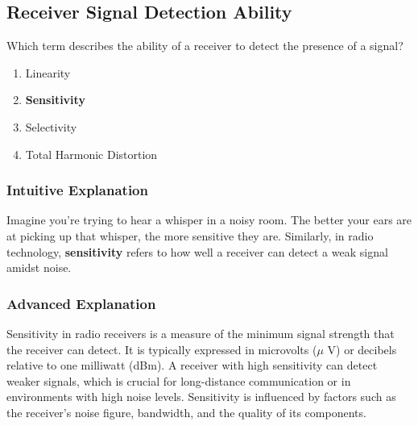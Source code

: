 \subsection{Receiver Signal Detection Ability}
\label{T7A01}

\begin{tcolorbox}[colback=gray!10!white,colframe=black!75!black,title=T7A01]
Which term describes the ability of a receiver to detect the presence of a signal?
\begin{enumerate}[noitemsep]
    \item Linearity
    \item \textbf{Sensitivity}
    \item Selectivity
    \item Total Harmonic Distortion
\end{enumerate}
\end{tcolorbox}

\subsubsection*{Intuitive Explanation}
Imagine you're trying to hear a whisper in a noisy room. The better your ears are at picking up that whisper, the more sensitive they are. Similarly, in radio technology, \textbf{sensitivity} refers to how well a receiver can detect a weak signal amidst noise.

\subsubsection*{Advanced Explanation}
Sensitivity in radio receivers is a measure of the minimum signal strength that the receiver can detect. It is typically expressed in microvolts ($\mu$ V) or decibels relative to one milliwatt (dBm). A receiver with high sensitivity can detect weaker signals, which is crucial for long-distance communication or in environments with high noise levels. Sensitivity is influenced by factors such as the receiver's noise figure, bandwidth, and the quality of its components. 

